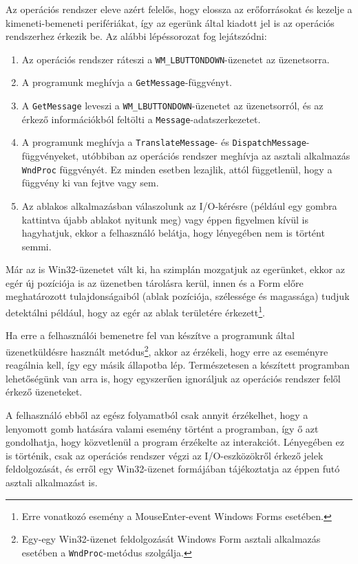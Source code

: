 \documentclass[tocnopagenum]{thesis-ekf}
\theoremstyle{definition}
\theoremstyle{remark}
\begin{document}
	Az operációs rendszer eleve azért felelős, hogy elossza az erőforrásokat és kezelje a kimeneti-bemeneti perifériákat, így az egerünk által kiadott jel is az operációs rendszerhez érkezik be.
	Az alábbi lépéssorozat fog lejátszódni:
	\begin{enumerate}
		\item Az operációs rendszer ráteszi a \verb*|WM_LBUTTONDOWN|-üzenetet az üzenetsorra.
		\item A programunk meghívja a \verb*|GetMessage|-függvényt.
		\item A \verb*|GetMessage| leveszi a \verb*|WM_LBUTTONDOWN|-üzenetet az üzenetsorról, és az érkező információkból feltölti a \verb*|Message|-adatszerkezetet.
		\item A programunk meghívja a \verb*|TranslateMessage|- és \verb*|DispatchMessage|-függvényeket, utóbbiban az operációs rendszer meghívja az asztali alkalmazás \verb*|WndProc| függvényét. Ez minden esetben lezajlik, attól függetlenül, hogy a függvény ki van fejtve vagy sem.
		\item Az ablakos alkalmazásban válaszolunk az I/O-kérésre (például egy gombra kattintva újabb ablakot nyitunk meg) vagy éppen figyelmen kívül is hagyhatjuk, ekkor a felhasználó belátja, hogy lényegében nem is történt semmi.
	\end{enumerate}
	
	Már az is Win32-üzenetet vált ki, ha szimplán mozgatjuk az egerünket, ekkor az egér új pozíciója is az üzenetben tárolásra kerül, innen és a Form előre meghatározott tulajdonságaiból (ablak pozíciója, szélessége és magassága) tudjuk detektálni például, hogy az egér az ablak területére érkezett\footnote{Erre vonatkozó esemény a MouseEnter-event Windows Forms esetében.}.
	
	Ha erre a felhasználói bemenetre fel van készítve a programunk által üzenetküldésre használt metódus\footnote{Egy-egy Win32-üzenet feldolgozását Windows Form asztali alkalmazás esetében a \verb*|WndProc|-metódus szolgálja.}, akkor az érzékeli, hogy erre az eseményre reagálnia kell, így egy másik állapotba lép. Természetesen a készített programban lehetőségünk van arra is, hogy egyszerűen ignoráljuk az operációs rendszer felől érkező üzeneteket.
	
	A felhasználó ebből az egész folyamatból csak annyit érzékelhet, hogy a lenyomott gomb hatására valami esemény történt a programban, így ő azt gondolhatja, hogy közvetlenül a program érzékelte az interakciót. Lényegében ez is történik, csak az operációs rendszer végzi az I/O-eszközökről érkező jelek feldolgozását, és erről egy Win32-üzenet formájában tájékoztatja az éppen futó asztali alkalmazást is.
\end{document}
